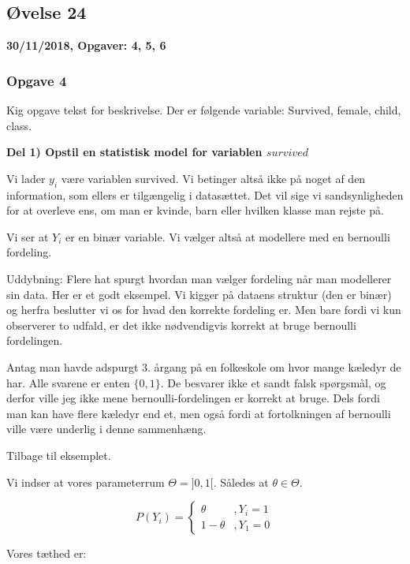\horizline

\subsection{Øvelse 24}

\textbf{30/11/2018, Opgaver: 4, 5, 6}

\subsubsection{Opgave 4}

Kig opgave tekst for beskrivelse. Der er følgende variable: Survived, female, child, class.

\textbf{Del 1) Opstil en statistisk model for variablen $survived$}

Vi lader $y_i$ være variablen survived. Vi betinger altså ikke på noget af den information, som ellers er tilgængelig i datasættet. Det vil sige vi sandsynligheden for at overleve ens, om man er kvinde, barn eller hvilken klasse man rejste på.

Vi ser at $Y_i$ er en binær variable. Vi vælger altså at modellere med en bernoulli fordeling.

Uddybning: Flere hat spurgt hvordan man vælger fordeling når man modellerer sin data. Her er et godt eksempel. Vi kigger på dataens struktur (den er binær) og herfra beslutter vi os for hvad den korrekte fordeling er. Men bare fordi vi kun observerer to udfald, er det ikke nødvendigvis korrekt at bruge bernoulli fordelingen.

Antag man havde adspurgt 3. årgang på en folkeskole om hvor mange kæledyr de har. Alle svarene er enten $\{0, 1\}$. De besvarer ikke et sandt falsk spørgsmål, og derfor ville jeg ikke mene bernoulli-fordelingen er korrekt at bruge. Dels fordi man kan have flere kæledyr end et, men også fordi at fortolkningen af bernoulli ville være underlig i denne sammenhæng.

Tilbage til eksemplet.

Vi indser at vores parameterrum $\Theta = ]0, 1[$. Således at $\theta \in \Theta$.

\begin{equation}
    P(Y_i) = \begin{cases}
        \theta &, Y_i = 1 \\
        1 - \theta &, Y_1 = 0
    \end{cases}
\end{equation}


Vores tæthed er:

